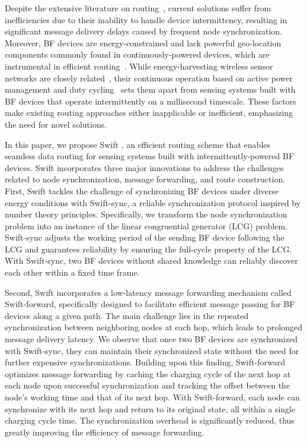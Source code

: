 \documentclass[lettersize,journal]{IEEEtran}
\newcommand{\ours}{Swift\xspace}
\newcommand{\sync}{Swift-sync\xspace}
\newcommand{\forward}{Swift-forward\xspace}
\begin{document}
Despite the extensive literature on routing~\cite{2012-csur-wsn}, current solutions suffer from inefficiencies due to their inability to handle device intermittency, resulting in significant message delivery delays caused by frequent node synchronization. Moreover, BF devices are energy-constrained and lack powerful geo-location components commonly found in continuously-powered devices, which are instrumental in efficient routing~\cite{2012-csur-wsn}. While energy-harvesting wireless sensor networks are closely related~\cite{2018-tsn-ehwsn,2021-tgcn-renew}, their continuous operation based on active power management and duty cycling~\cite{2014-mobihoc-eh,2016-infocom-panda,2018-infocom-ehwsn,2019-sigcomm-nd} sets them apart from sensing systems built with BF devices that operate intermittently on a millisecond timescale. These factors make existing routing approaches either inapplicable or inefficient, emphasizing the need for novel solutions.

In this paper, we propose \ours
, an efficient routing scheme that enables seamless data routing for sensing systems built with intermittently-powered BF devices. \ours incorporates three major innovations to address the challenges related to node synchronization, message forwarding, and route construction. First, \ours tackles the challenge of synchronizing BF devices under diverse energy conditions with \sync, a reliable synchronization protocol inspired by number theory principles. Specifically, we transform the node synchronization problem into an instance of the linear congruential generator (LCG) problem. \sync adjusts the working period of the sending BF device following the LCG and guarantees reliability by ensuring the full-cycle property of the LCG. With \sync, two BF devices without shared knowledge can reliably discover each other within a fixed time frame.

Second, \ours incorporates a low-latency message forwarding mechanism called \forward, specifically designed to facilitate efficient message passing for BF devices along a given path. The main challenge lies in the repeated synchronization between neighboring nodes at each hop, which leads to prolonged message delivery latency. We observe that once two BF devices are synchronized with \sync, they can maintain their synchronized state without the need for further expensive synchronizations. Building upon this finding, \forward optimizes message forwarding by caching the charging cycle of the next hop at each node upon successful synchronization and tracking the offset between the node's working time and that of its next hop. With \forward, each node can synchronize with its next hop and return to its original state, all within a single charging cycle time. The synchronization overhead is significantly reduced, thus greatly improving the efficiency of message forwarding.
\end{document}
